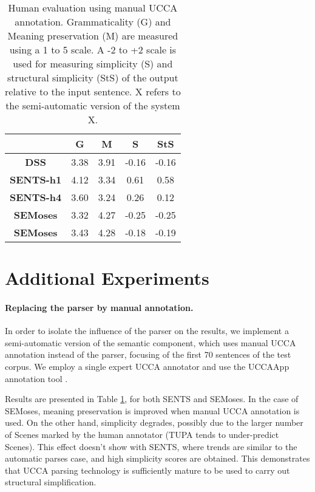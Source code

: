 \documentclass[11pt,a4paper]{article}
\begin{document}
\vspace{-0.3cm}
\begin{center}
\begin{table}[t]
\scriptsize
\centering
\begin{tabular}{|c|c|c|c|c|}
\hline
& {\bf G} & {\bf M} & {\bf S} & {\bf StS} \\
\hline\hline
{\bf DSS}& 3.38& 3.91& -0.16& -0.16 \\
\hline
{\bf SENTS-h1} & 4.12 & 3.34 & 0.61 & 0.58 \\
\hline
{\bf SENTS-h4} & 3.60 & 3.24 & 0.26 & 0.12 \\
\hline
{\bf SEMoses} & 3.32& 4.27& -0.25& -0.25 \\
\hline
{\bf SEMoses} & 3.43& 4.28 & -0.18& -0.19 \\
\hline    
\end{tabular}
\vspace{-0.1cm}
\hfill
\caption{\label{tab:human_evaluation_semisuper}
Human evaluation using manual UCCA annotation. Grammaticality (G) and Meaning preservation (M) are measured using a 1 to 5 scale. A -2 to +2 scale is used for measuring simplicity (S) and structural simplicity (StS) of the output relative to the input sentence. X refers to the semi-automatic version of the system X.
}
\end{table}
\end{center}

\section{Additional Experiments} \label{sec:additional_exps}

\paragraph{Replacing the parser by manual annotation.}
In order to isolate the influence of the parser on the results, we implement a semi-automatic version of the semantic component, 
which uses manual UCCA annotation instead of the parser, focusing of the first 70 sentences of the test corpus. 
We employ a single expert UCCA annotator and use the UCCAApp annotation tool \cite{A17}.

Results are presented in Table \ref{tab:human_evaluation_semisuper}, for both SENTS and SEMoses. 
In the case of SEMoses, meaning preservation is improved when manual UCCA annotation is used. 
On the other hand, simplicity degrades, possibly due to the larger number of Scenes marked by the human annotator
(TUPA tends to under-predict Scenes).
This effect doesn't show with SENTS, where trends are similar to the automatic parses case, and high simplicity scores are obtained.
This demonstrates that UCCA parsing technology is sufficiently mature to be used to carry out structural simplification.
\end{document}
